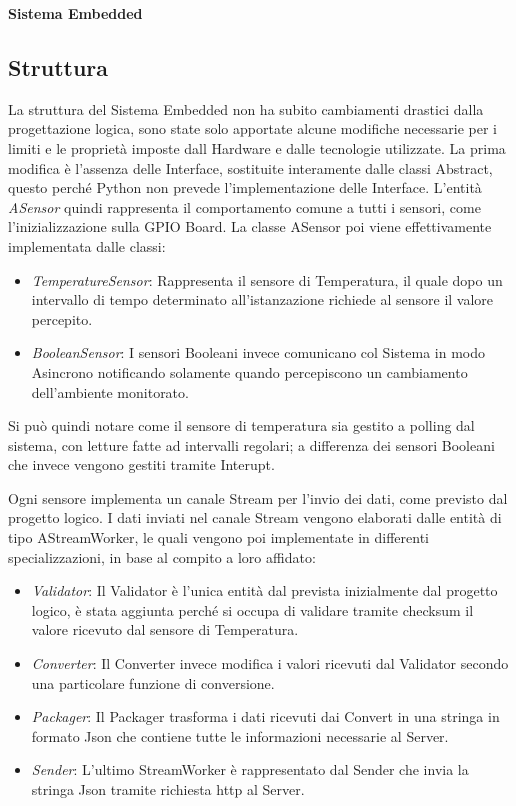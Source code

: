 \newpage

\begin{center}
  \textbf{Sistema Embedded}
\end{center}

\subsection{Struttura}
La struttura del Sistema Embedded non ha subito cambiamenti drastici dalla progettazione logica, sono state solo apportate alcune modifiche necessarie per i limiti e le propriet\`a imposte dall Hardware e dalle tecnologie utilizzate.
La prima modifica è l'assenza delle Interface, sostituite interamente dalle classi Abstract, questo perch\'e Python non prevede l'implementazione delle Interface.
L'entit\`a \textit{ASensor} quindi rappresenta il comportamento comune a tutti i sensori, come l'inizializzazione sulla GPIO Board.
La classe ASensor poi viene effettivamente implementata dalle classi:
\begin{itemize}
\item \textit{TemperatureSensor}: Rappresenta il sensore di Temperatura, il quale dopo un intervallo di tempo determinato all'istanzazione richiede al sensore il valore percepito.
\item \textit{BooleanSensor}: I sensori Booleani invece comunicano col Sistema in modo Asincrono notificando solamente quando percepiscono un cambiamento dell'ambiente monitorato.
\end{itemize}

Si pu\`o quindi notare come il sensore di temperatura sia gestito a polling dal sistema, con letture fatte ad intervalli regolari; a differenza dei sensori Booleani che invece vengono gestiti tramite Interupt.

Ogni sensore implementa un canale Stream per l'invio dei dati, come previsto dal progetto logico.
I dati inviati nel canale Stream vengono elaborati dalle entità di tipo AStreamWorker, le quali vengono poi implementate in differenti specializzazioni, in base al compito a loro affidato:
\begin{itemize}
\item \textit{Validator}: Il Validator \`e l'unica entit\`a dal prevista inizialmente dal progetto logico, \`e stata aggiunta perch\'e si occupa di validare tramite checksum il valore ricevuto dal sensore di Temperatura.
\item \textit{Converter}: Il Converter invece modifica i valori ricevuti dal Validator secondo una particolare funzione di conversione.
\item \textit{Packager}: Il Packager trasforma i dati ricevuti dai Convert in una stringa in formato Json che contiene tutte le informazioni necessarie al Server.
\item \textit{Sender}: L'ultimo StreamWorker \`e rappresentato dal Sender che invia la stringa Json tramite richiesta http al Server.
\end{itemize}

